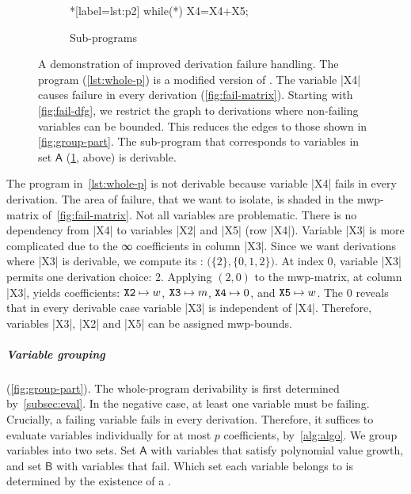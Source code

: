 \begin{figure}
\begin{subfigure}{\textwidth}
{\hspace{2em}%
\begin{minipage}{.35\textwidth}
\begin{implisting}*[label={lst:p2}]
while(*) {
  X4=X4+X5;
}
\end{implisting}
\end{minipage}
\caption{Sub-programs}\label{lst:sub-progs}
}\end{subfigure}
\caption[A demonstration of improved derivation failure handling]{
A demonstration of improved derivation failure handling.
The program (\ref{lst:whole-p}) is a modified version of \exname.
The variable \pr|X4| causes failure in every derivation (\ref{fig:fail-matrix}).
Starting with \ref{fig:fail-dfg}, we restrict the graph to derivations where non-failing variables can be bounded.
This reduces the edges to those shown in \ref{fig:group-part}.
The sub-program that corresponds to variables in set \(\mathsf{A}\) (\ref{lst:sub-progs}, above) is derivable.
}\label{fig:part-prog}
\end{figure}

\begin{example}\label{ex:whl}
The program in~\autoref{lst:whole-p} is not derivable because variable \pr|X4| fails in every derivation.
The area of failure, that we want to isolate, is shaded in the mwp-matrix of~\autoref{fig:fail-matrix}.
Not all variables are problematic.
There is no dependency from \pr|X4| to variables \pr|X2| and \pr|X5| (row \pr|X4|).
Variable \pr|X3| is more complicated due to the ∞ coefficients in column \pr|X3|.
Since we want derivations where \pr|X3| is derivable, we compute its : \(\big(\{2\}, \{0,1,2\}\big)\).
At index 0, variable \pr|X3| permits one derivation choice: 2.
Applying \((2,0)\) to the mwp-matrix, at column \pr|X3|, yields coefficients:
\(\text{\pr|X2|} \mapsto w\),
\(\text{\pr|X3|} \mapsto m\),
\(\text{\pr|X4|} \mapsto 0\), and
\(\text{\pr|X5|} \mapsto w\).
The \(0\) reveals that in every derivable case variable \pr|X3| is independent of \pr|X4|.
Therefore, variables \pr|X3|, \pr|X2| and \pr|X5| can be assigned mwp-bounds.
\end{example}

\subparagraph*{Variable grouping} (\autoref{fig:group-part}).
The whole-program derivability is first determined by~\autoref{subsec:eval}.
In the negative case, at least one variable must be failing.
Crucially, a failing variable fails in {every derivation}.
Therefore, it suffices to evaluate variables individually for at most \(p\) coefficients, by~\autoref{alg:algo}.
We group variables into two sets.
Set \(\mathsf{A}\) with variables that satisfy polynomial value growth, and set \(\mathsf{B}\) with variables that fail.
Which set each variable belongs to is determined by the existence of a .

